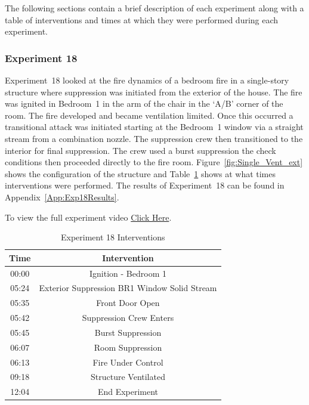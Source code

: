 \documentclass[12pt,oneside]{book}
\begin{document}
The following sections contain a brief description of each experiment along with a table of interventions and times at which they were performed during each experiment. 

\FloatBarrier

\subsubsection{Experiment 18}
Experiment~18 looked at the fire dynamics of a bedroom fire in a single-story structure where suppression was initiated from the exterior of the house. The fire was ignited in Bedroom~1 in the arm of the chair in the `A/B' corner of the room. The fire developed and became ventilation limited. Once this occurred a transitional attack was initiated starting at the Bedroom~1 window via a straight stream from a combination nozzle.  The suppression crew then transitioned to the interior for final suppression. The crew used a burst suppression the check conditions then proceeded directly to the fire room. Figure~\ref{fig:Single_Vent_ext} shows the configuration of the structure and Table~\ref{Table:Exp18Interventions} shows at what times interventions were performed. The results of Experiment~18 can be found in Appendix~\ref{App:Exp18Results}. 

To view the full experiment video \href{https://player.vimeo.com/video/170499622?autoplay=1}{Click Here}.

\begin{table}[H]
	\centering
	\caption{Experiment 18 Interventions}
	\begin{tabular}{|c|c|} 
		\hline
		Time & Intervention \\ \hline \hline
		00:00 & Ignition - Bedroom 1 \\ \hline
		05:24 & Exterior Suppression BR1 Window Solid Stream \\ \hline
		05:35 & Front Door Open \\ \hline
		05:42 & Suppression Crew Enters\\ \hline
		05:45 & Burst Suppression \\ \hline 
		06:07 & Room Suppression \\ \hline
		06:13 & Fire Under Control 	\\ \hline
		09:18 & Structure Ventilated \\ \hline
		12:04 & End Experiment\\ \hline
	\end{tabular}
	\label{Table:Exp18Interventions}
\end{table}
\end{document}
